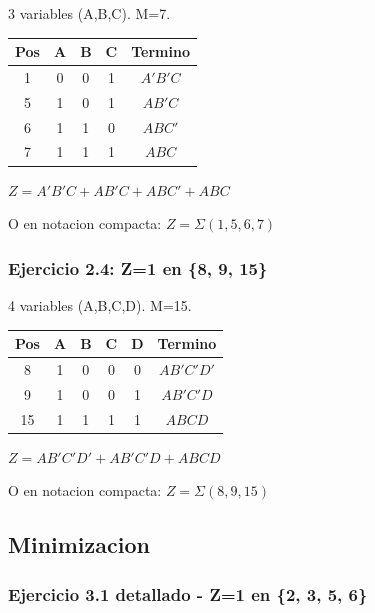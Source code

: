 \documentclass[12pt,a4paper]{article}
\begin{document}
3 variables (A,B,C). M=7.

\begin{center}
\begin{tabular}{|c|c|c|c|c|}
\hline
Pos & A & B & C & Termino \\
\hline
1 & 0 & 0 & 1 & $A'B'C$ \\
5 & 1 & 0 & 1 & $AB'C$ \\
6 & 1 & 1 & 0 & $ABC'$ \\
7 & 1 & 1 & 1 & $ABC$ \\
\hline
\end{tabular}
\end{center}

$Z = A'B'C + AB'C + ABC' + ABC$

O en notacion compacta: $Z = \Sigma(1,5,6,7)$

\subsubsection{Ejercicio 2.4: Z=1 en \{8, 9, 15\}}

4 variables (A,B,C,D). M=15.

\begin{center}
\begin{tabular}{|c|c|c|c|c|c|}
\hline
Pos & A & B & C & D & Termino \\
\hline
8 & 1 & 0 & 0 & 0 & $AB'C'D'$ \\
9 & 1 & 0 & 0 & 1 & $AB'C'D$ \\
15 & 1 & 1 & 1 & 1 & $ABCD$ \\
\hline
\end{tabular}
\end{center}

$Z = AB'C'D' + AB'C'D + ABCD$

O en notacion compacta: $Z = \Sigma(8,9,15)$


\subsection{Minimizacion}

\vspace{0.3cm}



\vspace{0.5cm}

\subsubsection{Ejercicio 3.1 detallado - Z=1 en \{2, 3, 5, 6\}}
\end{document}
